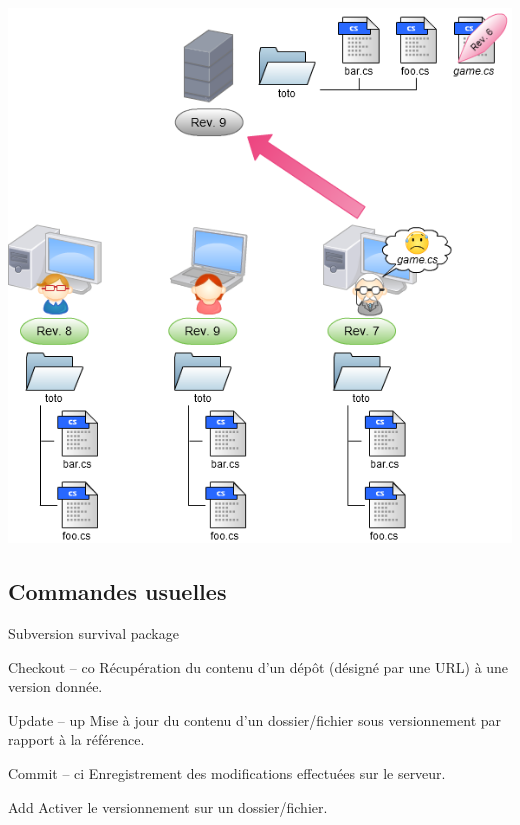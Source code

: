 \begin{frame}
  \begin{center}
    \includegraphics[scale=0.3]{images/16-Back1.png}
  \end{center}
\end{frame}


\subsection{Commandes usuelles}

\begin{frame}{Subversion survival package}
  \begin{block}{Checkout -- co}
    Récupération du contenu d'un dépôt (désigné par une URL) à une version donnée.
  \end{block}
  \begin{block}{Update -- up}
    Mise à jour du contenu d'un dossier/fichier sous versionnement par rapport à la référence.
  \end{block}
  \begin{block}{Commit -- ci}
    Enregistrement des modifications effectuées sur le serveur.
  \end{block}
  \begin{block}{Add}
    Activer le versionnement sur un dossier/fichier.
  \end{block}
\end{frame}

